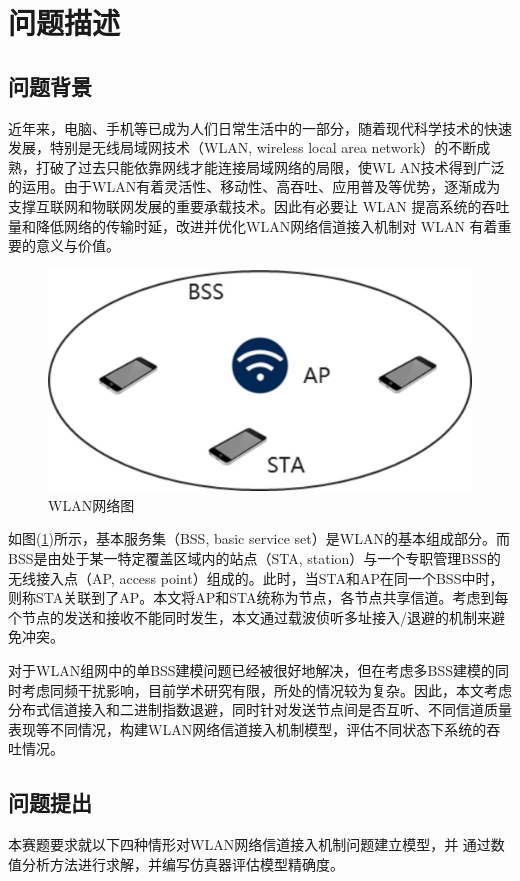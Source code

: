 \documentclass[bwprint]{gmcmthesis}
\begin{document}
\pagestyle{plain}

\tableofcontents

\newpage
\section{问题描述}

\subsection{问题背景}
近年来，电脑、手机等已成为人们日常生活中的一部分，随着现代科学技术的快速发展，特别是无线局域网技术（WLAN, wireless local area network）的不断成熟，打破了过去只能依靠网线才能连接局域网络的局限，使WL AN技术得到广泛的运用。由于WLAN有着灵活性、移动性、高吞吐、应用普及等优势，逐渐成为支撑互联网和物联网发展的重要承载技术。因此有必要让 WLAN 提高系统的吞吐量和降低网络的传输时延，改进并优化WLAN网络信道接入机制对 WLAN 有着重要的意义与价值。

\begin{figure}[H]
    \centering
    \includegraphics[width=.4\textwidth]{figures/wifi.png}
    \caption{WLAN网络图}
    \label{fig:wifi}
\end{figure}

如图(\ref{fig:wifi})所示，基本服务集（BSS, basic service set）是WLAN的基本组成部分。而BSS是由处于某一特定覆盖区域内的站点（STA, station）与一个专职管理BSS的无线接入点（AP, access point）组成的。此时，当STA和AP在同一个BSS中时，则称STA关联到了AP。本文将AP和STA统称为节点，各节点共享信道。考虑到每个节点的发送和接收不能同时发生，本文通过载波侦听多址接入/退避的机制来避免冲突。

对于WLAN组网中的单BSS建模问题已经被很好地解决，但在考虑多BSS建模的同时考虑同频干扰影响，目前学术研究有限，所处的情况较为复杂。因此，本文考虑分布式信道接入和二进制指数退避，同时针对发送节点间是否互听、不同信道质量表现等不同情况，构建WLAN网络信道接入机制模型，评估不同状态下系统的吞吐情况。

\subsection{问题提出}

本赛题要求就以下四种情形对WLAN网络信道接入机制问题建立模型，并
通过数值分析方法进行求解，并编写仿真器评估模型精确度。
\end{document}
